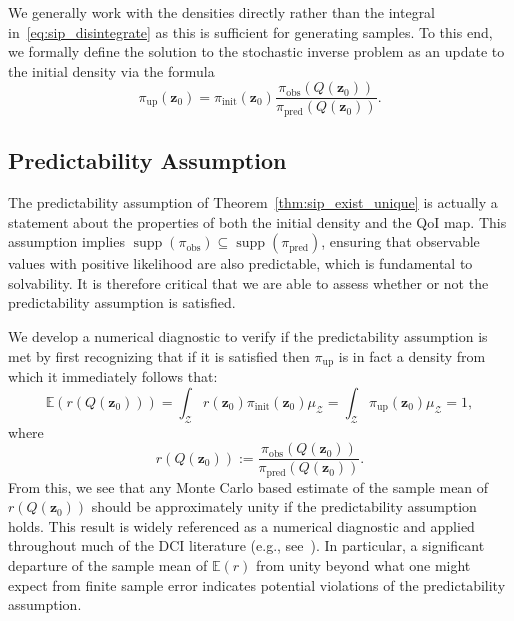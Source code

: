 \documentclass[final,1p,times]{elsarticle}
\DeclareMathOperator{\supp}{supp}
\begin{document}
We generally work with the densities directly rather than the integral in~\eqref{eq:sip_disintegrate} as this is sufficient for generating samples. 
To this end, we formally define the solution to the stochastic inverse problem as an update to the initial density via the formula
\begin{equation}
    \pi_{\mathrm{up}} \left(\mathbf{z}_{0}\right) = \pi_{\mathrm{init}} \left(\mathbf{z}_{0}\right) \frac{\pi_{\mathrm{obs}}\left( Q\left(\mathbf{z}_{0}\right) \right) }{\pi_{\mathrm{pred}} \left( Q \left(\mathbf{z}_{0}\right) \right)}. \label{eq:dci_problem2}
\end{equation}

\subsection{Predictability Assumption}
The predictability assumption of Theorem~\ref{thm:sip_exist_unique} is actually a statement about the properties of both the initial density and the QoI map. 
This assumption implies $\supp(\pi_{\mathrm{obs}}) \subseteq \supp(\pi_{\mathrm{pred}})$, ensuring that observable values with positive likelihood are also predictable, which is fundamental to solvability. 
It is therefore critical that we are able to assess whether or not the predictability assumption is satisfied. 

We develop a numerical diagnostic to verify if the predictability assumption is met by first recognizing that if it is satisfied then $\pi_{\mathrm{up}}$ is in fact a density from which it immediately follows that:
\begin{equation}\label{eq:e_r}
    \mathbb{E}\left(r\left(Q \left(\mathbf{z}_{0}\right)\right)\right) = \int_{\mathcal{Z}} r\left(\mathbf{z}_{0}\right) \pi_{\mathrm{init}}\left(\mathbf{z}_{0}\right) \mu_{\mathcal{Z}} = \int_{\mathcal{Z}} \pi_{\mathrm{up}} \left(\mathbf{z}_{0} \right) \mu_{\mathcal{Z}} = 1,
\end{equation}
where
\begin{equation}\label{eq:r}
r(Q(\mathbf{z}_{0})):=\frac{\pi_{\mathrm{obs}}(Q(\mathbf{z}_{0}))}{\pi_{\mathrm{pred}}(Q(\mathbf{z}_{0}))}.
\end{equation}
From this, we see that any Monte Carlo based estimate of the sample mean of $r(Q(\mathbf{z}_0))$ should be approximately unity if the predictability assumption holds. 
This result is widely referenced as a numerical diagnostic and applied throughout much of the DCI literature (e.g., see~\cite{Butler2018, Pilosov2023, del-Castillo-Negrete2024}).
In particular, a significant departure of the sample mean of $\mathbb{E}(r)$ from unity beyond what one might expect from finite sample error indicates potential violations of the predictability assumption.
\end{document}
